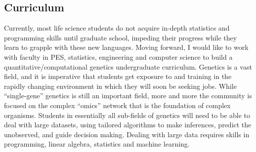\documentclass[11pt]{article}
\begin{document}
\subsection*{Curriculum}

Currently, most life science students do not acquire in-depth statistics and programming skills until graduate school, impeding their progress while they learn to grapple with these new languages. Moving forward, I would like to work with faculty in PES, statistics, engineering and computer science to build a quantitative/computational genetics undergraduate curriculum. Genetics is a vast field, and it is imperative that students get exposure to and training in the rapidly changing environment in which they will soon be seeking jobs. While ``single-gene'' genetics is still an important field, more and more the community is focused on the complex ``omics'' network that is the foundation of complex organisms. Students in essentially all sub-fields of genetics will need to be able to deal with large datasets, using tailored algorithms to make inferences, predict the unobserved, and guide decision making. Dealing with large data requires skills in programming, linear algebra, statistics and machine learning. 











\end{document}
